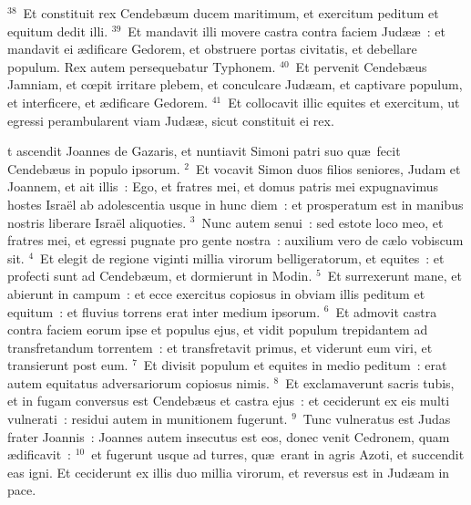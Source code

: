 ${}^{38}$~Et constituit rex Cendeb\ae um ducem maritimum, et exercitum peditum et equitum dedit illi.
${}^{39}$~Et mandavit illi movere castra contra faciem Jud\ae \ae~: et mandavit ei \ae dificare Gedorem, et obstruere portas civitatis, et debellare populum. Rex autem persequebatur Typhonem.
${}^{40}$~Et pervenit Cendeb\ae us Jamniam, et cœpit irritare plebem, et conculcare Jud\ae am, et captivare populum, et interficere, et \ae dificare Gedorem.
${}^{41}$~Et collocavit illic equites et exercitum, ut egressi perambularent viam Jud\ae \ae , sicut constituit ei rex.

\bchapter
{}t ascendit Joannes de Gazaris, et nuntiavit Simoni patri suo qu\ae\ fecit Cendeb\ae us in populo ipsorum.
${}^{2}$~Et vocavit Simon duos filios seniores, Judam et Joannem, et ait illis~: Ego, et fratres mei, et domus patris mei expugnavimus hostes Isra\"el ab adolescentia usque in hunc diem~: et prosperatum est in manibus nostris liberare Isra\"el aliquoties.
${}^{3}$~Nunc autem senui~: sed estote loco meo, et fratres mei, et egressi pugnate pro gente nostra~: auxilium vero de c\ae lo vobiscum sit.
${}^{4}$~Et elegit de regione viginti millia virorum belligeratorum, et equites~: et profecti sunt ad Cendeb\ae um, et dormierunt in Modin.
${}^{5}$~Et surrexerunt mane, et abierunt in campum~: et ecce exercitus copiosus in obviam illis peditum et equitum~: et fluvius torrens erat inter medium ipsorum.
${}^{6}$~Et admovit castra contra faciem eorum ipse et populus ejus, et vidit populum trepidantem ad transfretandum torrentem~: et transfretavit primus, et viderunt eum viri, et transierunt post eum.
${}^{7}$~Et divisit populum et equites in medio peditum~: erat autem equitatus adversariorum copiosus nimis.
${}^{8}$~Et exclamaverunt sacris tubis, et in fugam conversus est Cendeb\ae us et castra ejus~: et ceciderunt ex eis multi vulnerati~: residui autem in munitionem fugerunt.
${}^{9}$~Tunc vulneratus est Judas frater Joannis~: Joannes autem insecutus est eos, donec venit Cedronem, quam \ae dificavit~:
${}^{10}$~et fugerunt usque ad turres, qu\ae\ erant in agris Azoti, et succendit eas igni. Et ceciderunt ex illis duo millia virorum, et reversus est in Jud\ae am in pace.



